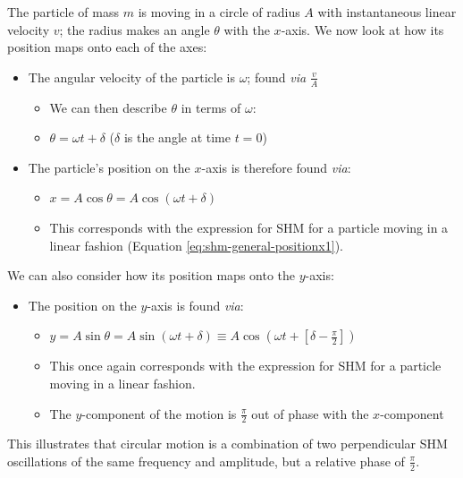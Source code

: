 \documentclass[
]{book}
\providecommand{\tightlist}{%
  \setlength{\itemsep}{0pt}\setlength{\parskip}{0pt}}
\begin{document}
The particle of mass \(m\) is moving in a circle of radius \(A\) with instantaneous linear velocity \(v\); the radius makes an angle \(\theta\) with the \(x\)-axis. We now look at how its position maps onto each of the axes:

\begin{itemize}
\tightlist
\item
  The angular velocity of the particle is \(\omega\); found \emph{via} \(\frac{v}{A}\)

  \begin{itemize}
  \tightlist
  \item
    We can then describe \(\theta\) in terms of \(\omega\):
  \item
    \(\theta = \omega t + \delta\) (\(\delta\) is the angle at time \(t=0\))
  \end{itemize}
\item
  The particle's position on the \(x\)-axis is therefore found \emph{via}:

  \begin{itemize}
  \tightlist
  \item
    \(x = A \cos \theta = A \cos (\omega t + \delta)\)
  \item
    This corresponds with the expression for SHM for a particle moving in a linear fashion (Equation \eqref{eq:shm-general-positionx1}).
  \end{itemize}
\end{itemize}

We can also consider how its position maps onto the \(y\)-axis:

\begin{itemize}
\tightlist
\item
  The position on the \(y\)-axis is found \emph{via}:

  \begin{itemize}
  \tightlist
  \item
    \(y = A \sin \theta = A \sin (\omega t + \delta) \equiv A \cos(\omega t + [\delta - \frac{\pi}{2}])\)
  \item
    This once again corresponds with the expression for SHM for a particle moving in a linear fashion.
  \item
    The \(y\)-component of the motion is \(\frac{\pi}{2}\) out of phase with the \(x\)-component
  \end{itemize}
\end{itemize}

This illustrates that circular motion is a combination of two perpendicular SHM oscillations of the same frequency and amplitude, but a relative phase of \(\frac{\pi}{2}\).
\end{document}
